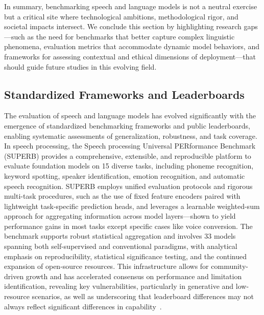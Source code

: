 \documentclass[sigconf]{acmart}
\begin{document}
In summary, benchmarking speech and language models is not a neutral exercise but a critical site where technological ambitions, methodological rigor, and societal impacts intersect. We conclude this section by highlighting research gaps—such as the need for benchmarks that better capture complex linguistic phenomena, evaluation metrics that accommodate dynamic model behaviors, and frameworks for assessing contextual and ethical dimensions of deployment—that should guide future studies in this evolving field.

\subsection{Standardized Frameworks and Leaderboards}

The evaluation of speech and language models has evolved significantly with the emergence of standardized benchmarking frameworks and public leaderboards, enabling systematic assessments of generalization, robustness, and task coverage. In speech processing, the Speech processing Universal PERformance Benchmark (SUPERB) provides a comprehensive, extensible, and reproducible platform to evaluate foundation models on 15 diverse tasks, including phoneme recognition, keyword spotting, speaker identification, emotion recognition, and automatic speech recognition. SUPERB employs unified evaluation protocols and rigorous multi-task procedures, such as the use of fixed feature encoders paired with lightweight task-specific prediction heads, and leverages a learnable weighted-sum approach for aggregating information across model layers—shown to yield performance gains in most tasks except specific cases like voice conversion. The benchmark supports robust statistical aggregation and involves 33 models spanning both self-supervised and conventional paradigms, with analytical emphasis on reproducibility, statistical significance testing, and the continued expansion of open-source resources. This infrastructure allows for community-driven growth and has accelerated consensus on performance and limitation identification, revealing key vulnerabilities, particularly in generative and low-resource scenarios, as well as underscoring that leaderboard differences may not always reflect significant differences in capability~\cite{ref101,ref104}.
\end{document}
